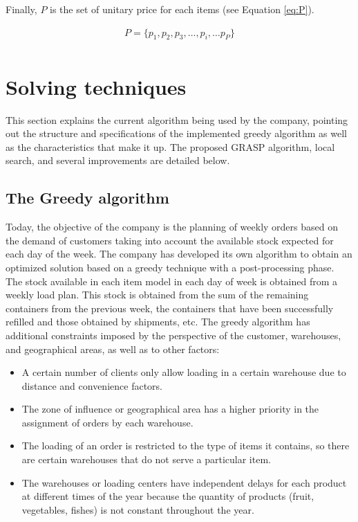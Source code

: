 \documentclass[letterpaper]{article} %
\begin{document}
Finally, $P$ is the set of unitary price for each items (see Equation \ref{eq:P}).

\begin{equation}
    \begin{aligned}\label{eq:P}
        P = \{p_1, p_2, p_3, \dots, p_i, \dots p_P \}\\
    \end{aligned}
\end{equation}


\section*{Solving techniques}

This section explains the current algorithm being used by the company, pointing out the structure and specifications of the implemented greedy algorithm as well as the characteristics that make it up. The proposed GRASP algorithm, local search, and several improvements are detailed below.

\subsection*{The Greedy algorithm }
Today, the objective of the company is the planning of weekly orders based on the demand of customers taking into account the available stock expected for each day of the week. The company has developed its own algorithm to obtain an optimized solution based on a greedy technique with a post-processing phase.
The stock available in each item model in each day of week is obtained from a weekly load plan. This stock is obtained from the sum of the remaining containers from the previous week, the containers that have been successfully refilled and those obtained by shipments, etc. The greedy algorithm has additional constraints imposed by the perspective of the customer, warehouses, and geographical areas, as well as to other factors:

\begin{itemize}
    \item A certain number of clients only allow loading in a certain warehouse due to distance and convenience factors.
    \item The zone of influence or geographical area has a higher priority in the assignment of orders by each warehouse.
    \item The loading of an order is restricted to the type of items it contains, so there are certain warehouses that do not serve a particular item.
    \item The warehouses or loading centers have independent delays for each product at different times of the year because the quantity of products (fruit, vegetables, fishes) is not constant throughout the year.
\end{itemize}
\end{document}
